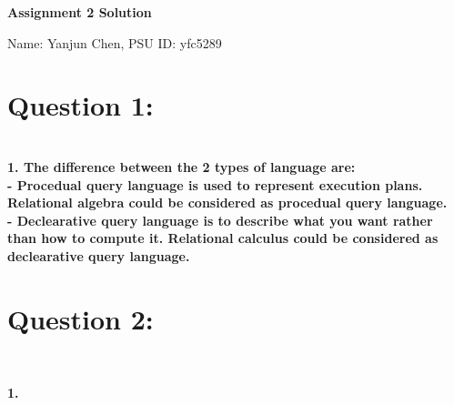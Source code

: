 \documentclass[letterpaper,11pt]{article}
\newcommand{\Paragraph}[1]{~\vspace*{-0.7\baselineskip}\\{\bf #1}}
\begin{document}
\begin{center}
	{\LARGE \bf Assignment 2 Solution}
	
	{\large
	Name: Yanjun Chen, PSU ID: yfc5289}
\end{center}

\section*{Question 1:}

\Paragraph{1.
	The difference between the 2 types of language are: \\
	- Procedual query language is used to represent execution plans. Relational algebra could be considered as procedual query language. \\
	- Declearative query language is to describe what you want rather than how to compute it. Relational calculus could be considered as declearative query language. \\
}

\section*{Question 2:}
\Paragraph{1. 
	


}
\end{document}
